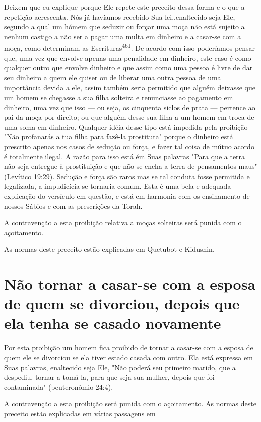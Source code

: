 \begin{itemize}
\begin{enumrate}
\begin{itemize}
\begin{itemize}
\begin{itemize}
Deixem que eu explique porque Ele repete este preceito dessa forma e o
que a repetição acrescenta. Nós já havíamos recebido Sua
lei,.enaltecido seja Ele, segundo a qual um hómem que
seduzir ou forçar uma moça não está sujeito a nenhum castigo a não ser a
pagar uma multa em dinheiro e a casar-se com a moça, como determinam as
Escrituras\textsuperscript{461}. De acordo com isso poderíamos pen­sar
que, uma vez que envolve apenas uma penalidade em dinheiro, este caso é
como qualquer outro que envolve dinheiro e que assim como uma pessoa é
livre de dar seu dinheiro a quem ele quiser ou de liberar uma outra
pessoa de uma importância devida a ele, assim também seria permitido que
alguém deixas­se que um homem se chegasse a sua filha solteira e
renunciasse ao pagamento em dinheiro, uma vez que isso --- ou seja, os
cinquenta siclos de prata --- perten­ce ao pai da moça por direito; ou
que alguém desse sua filha a um homem em troca de uma soma em dinheiro.
Qualquer idéia desse tipo está impedida pela proibição "Não profanarás a
tua filha para fazê-la prostituta" porque o dinheiro está prescrito
apenas nos casos de sedução ou força, e fazer tal coisa de mútuo acordo
é totalmente ilegal. A razão para isso está ém Suas palavras "Para que a
terra não seja entregue à prostituição e que não se encha a terra de
pensamentos maus" (Levítico 19:29). Sedução e força são raros mas se tal
conduta fosse per­mitida e legalizada, a impudicícia se tornaria comum.
Esta é uma bela e adequa­da explicação do versículo em questão, e está
em harmonia com os ensinamen­to de nossos Sábios e com as prescrições da
Torah.

A contravenção a esta proibição relativa a moças solteiras será puni­da
com o açoitamento.


As normas deste preceito estão explicadas em Quetubot e Kidushin.


\section{Não tornar a casar-se com a esposa de quem se divorciou,
depois que ela tenha se casado novamente}

Por esta proibição um homem fica proibido de tornar a casar-se com a
esposa de quem ele se divorciou se ela tiver estado casada com outro.
Ela está expressa em Suas palavras, enaltecido seja Ele, "Não poderá seu
primeiro marido, que a despediu, tornar a tomá-la, para que seja sua
mulher, depois que foi contaminada" (beuteronômio 24:4).

A contravenção a esta proibição será punida com o açoitamento. As normas
deste preceito estão explicadas em várias passagens em


\end{itemize}
\end{itemize}
\end{itemize}
\end{enumrate}
\end{itemize}
